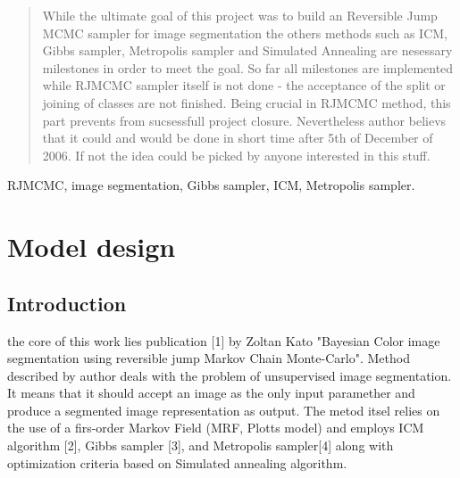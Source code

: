 \documentclass[journal]{IEEEtran}
\begin{document}
\maketitle


\begin{abstract}
While the ultimate goal of this project was to build an Reversible Jump MCMC sampler for image segmentation the others methods such as ICM, Gibbs sampler, Metropolis sampler and Simulated Annealing are nesessary milestones in order to meet the goal. So far all milestones are implemented while RJMCMC sampler itself is not done - the acceptance of the split or joining of classes are not finished. Being crucial in RJMCMC method, this part prevents from sucsessfull project closure. Nevertheless author believs that it could and would be done in short time after 5th of December of 2006. If not the idea could be picked by anyone interested in this stuff.
\end{abstract}

\begin{keywords}
RJMCMC, image segmentation, Gibbs sampler, ICM, Metropolis sampler.
\end{keywords}

%
\IEEEpeerreviewmaketitle


\section{Model design}
\subsection{Introduction}
 the core of this work lies publication [1] by Zoltan Kato "Bayesian Color image segmentation using reversible jump Markov Chain Monte-Carlo". Method described by author deals with the problem of unsupervised image segmentation. It means that it should accept an image as the only input paramether and produce a segmented image representation as output. The metod itsel relies on the use of a firs-order Markov Field (MRF, Plotts model) and employs ICM algorithm [2], Gibbs sampler [3], and Metropolis sampler[4] along with optimization criteria based on Simulated annealing algorithm.
\end{document}
